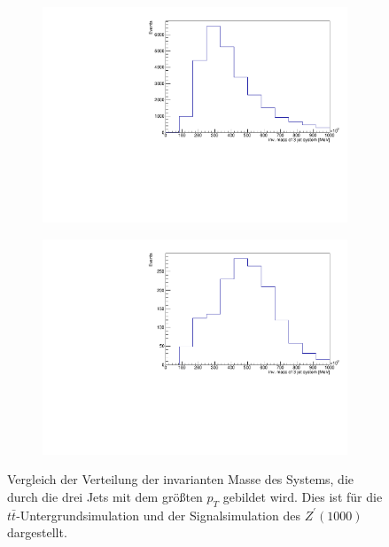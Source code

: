 \begin{figure}[H]
  \begin{subfigure}{0.5\textwidth}
    \centering
    \includegraphics[width=\linewidth]{plots_and_txt/ttbar.mu_selected_/ttbar.mu_selected_InvJetMass.pdf}
    \caption{}
    \label{fig:ttbar_sys2}
  \end{subfigure}%
  \begin{subfigure}{0.5\textwidth}
    \centering
    \includegraphics[width=\linewidth]{plots_and_txt/zprime1000.mu_selected_/zprime1000.mu_selected_InvJetMass.pdf}
    \caption{}
    \label{fig:zprime_sys2}
  \end{subfigure}%
  \caption{Vergleich der Verteilung der invarianten Masse des Systems, die durch die drei Jets mit dem größten $p_T$ gebildet wird.
  Dies ist für die $t\bar{t}$-Untergrundsimulation  und der Signalsimulation des $Z^\prime(1000)$  dargestellt.
  }
  \label{fig:Comparison2}
\end{figure}

